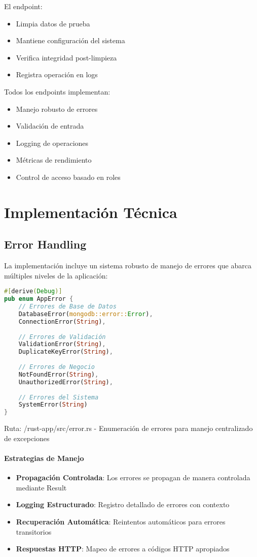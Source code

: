 \documentclass[12pt,letterpaper]{article}
\begin{document}
El endpoint:
\begin{itemize}
    \item Limpia datos de prueba
    \item Mantiene configuración del sistema
    \item Verifica integridad post-limpieza
    \item Registra operación en logs
\end{itemize}

Todos los endpoints implementan:
\begin{itemize}
    \item Manejo robusto de errores
    \item Validación de entrada
    \item Logging de operaciones
    \item Métricas de rendimiento
    \item Control de acceso basado en roles
\end{itemize}
\section{Implementación Técnica}
\subsection{Error Handling}
La implementación incluye un sistema robusto de manejo de errores que abarca múltiples niveles de la aplicación:

\begin{lstlisting}[language=rust]
#[derive(Debug)]
pub enum AppError {
    // Errores de Base de Datos
    DatabaseError(mongodb::error::Error),
    ConnectionError(String),
    
    // Errores de Validación
    ValidationError(String),
    DuplicateKeyError(String),
    
    // Errores de Negocio
    NotFoundError(String),
    UnauthorizedError(String),
    
    // Errores del Sistema
    SystemError(String)
}
\end{lstlisting}
\small{Ruta: /rust-app/src/error.rs - Enumeración de errores para manejo centralizado de excepciones}

\paragraph{Estrategias de Manejo}
\begin{itemize}
    \item \textbf{Propagación Controlada}: Los errores se propagan de manera controlada mediante Result
    \item \textbf{Logging Estructurado}: Registro detallado de errores con contexto
    \item \textbf{Recuperación Automática}: Reintentos automáticos para errores transitorios
    \item \textbf{Respuestas HTTP}: Mapeo de errores a códigos HTTP apropiados
\end{itemize}
\end{document}
